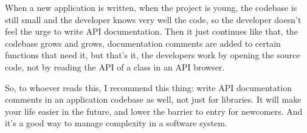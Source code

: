 \documentclass[a4paper,11pt]{article}
\begin{document}
When a new application is written, when the project is young, the codebase is still small and the developer knows very well the code, so the developer doesn't feel the urge to write API documentation. Then it just continues like that, the codebase grows and grows, documentation comments are added to certain functions that need it, but that's it, the developers work by opening the source code, not by reading the API of a class in an API browser.

So, to whoever reads this, I recommend this thing: write API documentation comments in an application codebase as well, not just for libraries. It will make your life easier in the future, and lower the barrier to entry for newcomers. And it's a good way to manage complexity in a software system.
\end{document}
